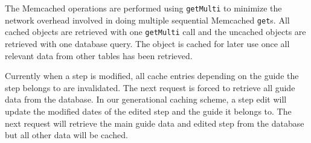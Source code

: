 \documentclass[12pt]{ucthesis}
\begin{document}
The \textsf{Memcached} operations are performed using {\tt getMulti} to minimize the network overhead involved in doing multiple sequential \textsf{Memcached} {\tt get}s.
All cached objects are retrieved with one {\tt getMulti} call and the uncached objects are retrieved with one database query.
The object is cached for later use once all relevant data from other tables has been retrieved.

Currently when a step is modified, all cache entries depending on the guide the step belongs to are invalidated.
The next request is forced to retrieve all guide data from the database.
In our generational caching scheme, a step edit will update the modified dates of the edited step and the guide it belongs to.
The next request will retrieve the main guide data and edited step from the database but all other data will be cached.
\end{document}
